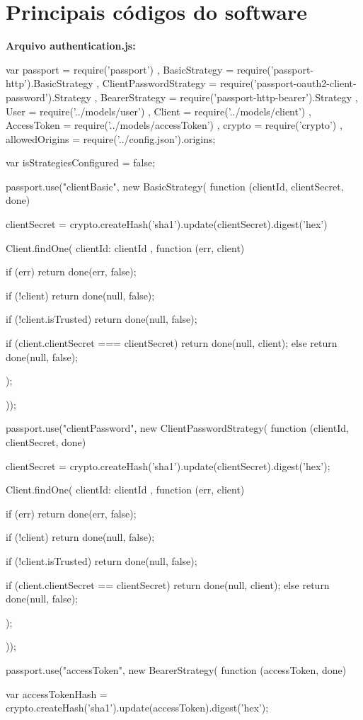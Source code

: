 \apendice
\chapter{Principais códigos do software}

\begin{flushleft}
	\textbf{Arquivo authentication.js:}
	
	var passport = require('passport')
	, BasicStrategy = require('passport-http').BasicStrategy
	, ClientPasswordStrategy = require('passport-oauth2-client-password').Strategy
	, BearerStrategy = require('passport-http-bearer').Strategy
	, User = require('../models/user')
	, Client = require('../models/client')
	, AccessToken = require('../models/accessToken')
	, crypto = require('crypto')
	, allowedOrigins = require('../config.json').origins;
	
	var isStrategiesConfigured = false;
	
	passport.use("clientBasic", new BasicStrategy(
	function (clientId, clientSecret, done) {
		clientSecret = crypto.createHash('sha1').update(clientSecret).digest('hex')
		
		Client.findOne({ clientId: clientId }, function (err, client) {
			if (err)
			return done(err, false);
			
			if (!client)
			return done(null, false);
			
			if (!client.isTrusted)
			return done(null, false);
			
			if (client.clientSecret === clientSecret)
			return done(null, client);
			else
			return done(null, false);
		});
	}
	));
	
	passport.use("clientPassword", new ClientPasswordStrategy(
	function (clientId, clientSecret, done) {
		clientSecret = crypto.createHash('sha1').update(clientSecret).digest('hex');
		
		Client.findOne({ clientId: clientId }, function (err, client) {
			if (err) 
			return done(err, false);
			
			if (!client)
			return done(null, false);
			
			if (!client.isTrusted)
			return done(null, false);
			
			if (client.clientSecret == clientSecret)
			return done(null, client);
			else
			return done(null, false);
		});
	}
	));
	
	passport.use("accessToken", new BearerStrategy(
	function (accessToken, done) {
		var accessTokenHash = crypto.createHash('sha1').update(accessToken).digest('hex');
		
}
\end{flushleft}
